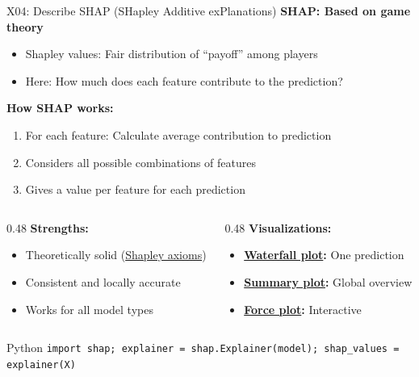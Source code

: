 \documentclass[aspectratio=169, 10pt]{beamer}
\begin{document}
\begin{frame}{X04: Describe SHAP (SHapley Additive exPlanations)}
    \textbf{SHAP: Based on game theory}
    
    \begin{itemize}
        \item Shapley values: Fair distribution of ``payoff'' among players
        \item Here: How much does each feature contribute to the prediction?
    \end{itemize}
    
    \vspace{0.2cm}
    \textbf{How SHAP works:}
    \begin{enumerate}
        \item For each feature: Calculate average contribution to prediction
        \item Considers all possible combinations of features
        \item Gives a value per feature for each prediction
    \end{enumerate}
    
    \vspace{0.15cm}
    \begin{columns}[T]
        \begin{column}{0.48\textwidth}
            \textbf{Strengths:}
            \begin{itemize}
                \item Theoretically solid (\href{https://en.wikipedia.org/wiki/Shapley_value}{Shapley axioms})
                \item Consistent and locally accurate
                \item Works for all model types
            \end{itemize}
        \end{column}
        \begin{column}{0.48\textwidth}
            \textbf{Visualizations:}
            \begin{itemize}
                \item \textbf{\href{https://shap.readthedocs.io/en/latest/example_notebooks/api_examples/plots/waterfall.html}{Waterfall plot}:} One prediction
                \item \textbf{\href{https://shap.readthedocs.io/en/latest/example_notebooks/api_examples/plots/beeswarm.html}{Summary plot}:} Global overview
                \item \textbf{\href{https://shap.readthedocs.io/en/latest/example_notebooks/tabular_examples/tree_based_models/Force\%20Plot\%20Colors.html}{Force plot}:} Interactive
            \end{itemize}
        \end{column}
    \end{columns}
    
    {\footnotesize
    \begin{block}{Python}
        \texttt{import shap; explainer = shap.Explainer(model); shap\_values = explainer(X)}
    \end{block}
    }
\end{frame}
\end{document}
